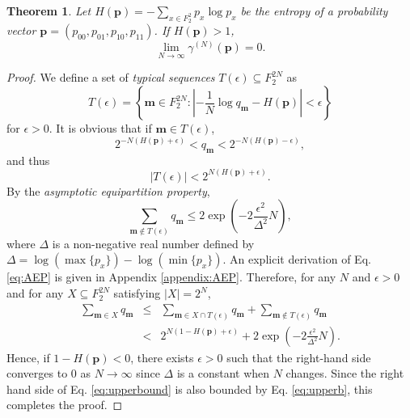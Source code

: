 \documentclass[aps,prx,twocolumn,showpacs,amsmath,notitlepage,amssymb,superscriptaddress]{revtex4-1}
\newtheorem{theorem}{Theorem}
\begin{document}
\begin{theorem}
\label{theorem:upperbound}
 Let $H(\mathbf{p})=-\sum_{x\in F_2^{2}}p_x\log p_x$ be the entropy of a probability vector $\mathbf{p}=(p_{00},p_{01},p_{10},p_{11})$. If $H(\mathbf{p})>1$,
\begin{equation}
 \lim_{N\rightarrow\infty}\gamma^{(N)}(\mathbf{p})=0.
\end{equation}
\end{theorem}


\begin{proof}
 We define a set of {\it typical sequences} $T(\epsilon)\subseteq F_2^{2N}$ as
 \begin{equation}
 T(\epsilon)=\left\{\mathbf{m}\in F_2^{2N}:\left|-\frac{1}{N}\log q_\mathbf{m}-H(\mathbf{p})\right|<\epsilon\right\}
\end{equation}
for $\epsilon>0$. It is obvious that if $\mathbf{m}\in T(\epsilon)$,
\begin{equation}
\label{eq:rangeqm}
 2^{-N(H(\mathbf{p})+\epsilon)}<q_{\mathbf{m}}< 2^{-N(H(\mathbf{p})-\epsilon)},
\end{equation}
and thus
\begin{equation}
 |T(\epsilon)|<2^{N(H(\mathbf{p})+\epsilon)}.
\end{equation}
By the {\it asymptotic equipartition property},
\begin{equation}
\label{eq:AEP}
  \sum_{\mathbf{m}\notin T(\epsilon)}q_{\mathbf{m}}\leq 2\exp\left(-2\frac{\epsilon^2}{\Delta^2}N\right),
\end{equation}
where $\Delta$ is a non-negative real number defined by $\Delta=\log (\max\{p_x\})-\log (\min\{p_x\})$.
An explicit derivation of Eq. \eqref{eq:AEP} is given in Appendix \ref{appendix:AEP}. Therefore, for any $N$ and $\epsilon>0$ and for any $X\subseteq F_2^{2N}$ satisfying $|X|=2^N$,
\begin{eqnarray}
 \sum_{\mathbf{m}\in X}q_{\mathbf{m}}&\leq&\sum_{\mathbf{m}\in X\cap T(\epsilon)}q_{\mathbf{m}}+\sum_{\mathbf{m}\notin T(\epsilon)}q_{\mathbf{m}}\\
 \label{eq:upperb}
 &<&2^{N(1-H(\mathbf{p})+\epsilon)}+2\exp\left(-2\frac{\epsilon^2}{\Delta^2}N\right).
\end{eqnarray}
Hence, if $1-H(\mathbf{p})<0$, there exists $\epsilon>0$ such that the right-hand side converges to $0$ as $N\rightarrow\infty$ since $\Delta$ is a constant when $N$ changes. Since the right hand side of Eq. \eqref{eq:upperbound} is also bounded by Eq. \eqref{eq:upperb}, this completes the proof.
\end{proof}
\end{document}
